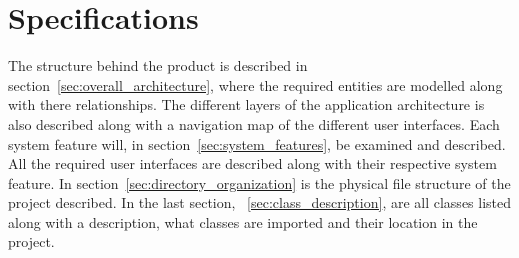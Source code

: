 \section{Specifications}
\label{sec:specifications}
The structure behind the product is described in  section~\ref{sec:overall_architecture}, where the required entities are modelled along with there relationships. The different layers of the application architecture is also described along with a navigation map of the different user interfaces. Each system feature will, in section~\ref{sec:system_features}, be examined and described. All the required user interfaces are described along with their respective system feature. In section~\ref{sec:directory_organization} is the physical file structure of the project described. In the last section, ~\ref{sec:class_description}, are all classes listed along with a description, what classes are imported and their location in the project.


